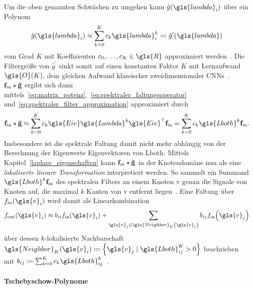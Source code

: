 Um die oben genannten Schwächen zu umgehen kann $\hat g\left(\gls{lambda}_i\right)$ über ein Polynom\begin{equation}
  \hat g\left(\gls{lambda}_i\right) \approx \sum_{k=0}^K c_k\gls{lambda}_i^k \eqqcolon \hat g^{\prime}\left(\gls{lambda}\right)
  \label{eq:spektraler_filter_approximation}
\end{equation}
vom Grad $K$ mit Koeffizienten $c_0, \ldots, c_K \in \gls{R}$ approximiert werden~\cite{Hammond, Defferrard}.
Die Filtergröße von $\hat g^{\prime}$ sinkt somit auf einen konstanten Faktor $K$ mit Lernaufwand $\gls{O}\left(K\right)$, \dhe{} dem gleichen Aufwand klassischer zweidimensionaler \glspl{CNN}~\cite{Defferrard}.
$\mathbf{f}_{\mathrm{in}} \star \mathbf{\hat g}$ ergibt sich dann mittels~\eqref{eq:matrix_potenz},~\eqref{eq:spektraler_faltungsoperator} und~\eqref{eq:spektraler_filter_approximation} approximiert durch~\cite{Defferrard}
\begin{equation}
  \ve{f}_{\mathrm{in}} \star \ve{\hat g} \approx \sum_{k=0}^K c_k\gls{Eiv}\gls{Lambda}^k\gls{Eiv}^{\top}\ve{f}_{\mathrm{in}} = \sum_{k=0}^K c_k \gls{Lboth}^k \ve{f}_{\mathrm{in}}.
  \label{eq:spektraler_faltungsoperator_approximation}
\end{equation}
Insbesondere ist die spektrale Faltung damit nicht mehr abhängig von der Berechnung der Eigenwerte \bzw{} Eigenvektoren von \gls{Lboth}.
Mittels Kapitel~\ref{laplace_eigenschaften} kann $\mathbf{f}_{\mathrm{in}} \star \mathbf{\hat g}$ in der Knotendomäne nun als eine \emph{lokaliserte lineare Transformation} interpretiert werden.
So sammelt ein Summand $\gls{Lboth}^k\ve{f}_{\mathrm{in}}$ des spektralen Filters an einem Knoten \gls{v} genau die Signale von Knoten auf, die maximal $k$ Kanten von \gls{v} entfernt liegen~\cite{Hammond}.
Eine Faltung über $f_{\mathrm{in}}\left(\gls{v}_i\right)$ wird damit als Linearkombination
\begin{equation*}
  f_{\mathrm{out}}\left(\gls{v}_i\right) \approx b_{ii} f_{\mathrm{in}}\left(\gls{v}_i\right) + \sum_{\gls{v}_j \in \gls{Neighbor}_K\left(\gls{v}_i\right)} b_{ij} f_{\mathrm{in}}\left(\gls{v}_j\right)
\end{equation*}
über dessen $k$-lokalisierte Nachbarschaft $\gls{Neighbor}_K\left(\gls{v}_i\right) \coloneqq \left\{ \gls{v}_j \mid \gls{Lboth}^K_{ij} > 0 \right\}$ beschrieben mit $b_{ij} \coloneqq \sum_{k=0}^K c_k \gls{Lboth}^k_{ij}$~\cite{Shuman}.

\paragraph{Tschebyschow-Polynome}
\label{tschebyschow_polynome}

